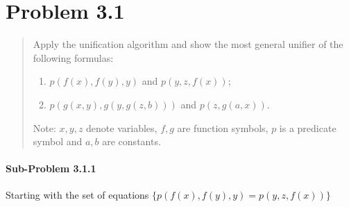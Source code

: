 \documentclass[11pt,a4paper]{article}
\begin{document}
\section*{Problem 3.1}
\begin{quote}
Apply the unification algorithm and show the most general unifier of the
following formulas:
\begin{enumerate}
\item $p(f (x), f (y), y)$ and $p(y, z, f (x))$;
\item $p(g(x, y), g(y, g(z, b)))$ and $p(z, g(a, x))$.
\end{enumerate}
Note: $x, y, z$ denote variables, $f, g$ are function symbols, $p$ is a predicate symbol and $a, b$ are constants.
\end{quote}

\paragraph*{Sub-Problem 3.1.1} Starting with the set of equations $\{ p(f (x), f (y), y)= p(y, z, f (x))\}$
\end{document}
